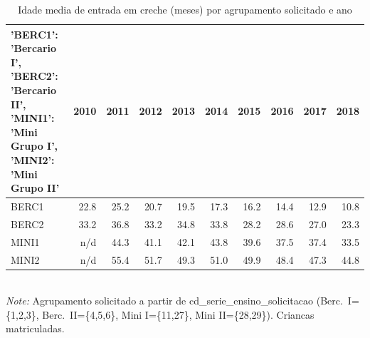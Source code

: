 \begin{table}[htbp]\centering
\caption{Idade media de entrada em creche (meses) por agrupamento solicitado e ano}
\label{tab:T3d_agrup}
\small
\setlength{\tabcolsep}{4pt}
\begin{tabular}{lrrrrrrrrr}
\toprule
{'BERC1': 'Bercario I', 'BERC2': 'Bercario II', 'MINI1': 'Mini Grupo I', 'MINI2': 'Mini Grupo II'} & 2010 & 2011 & 2012 & 2013 & 2014 & 2015 & 2016 & 2017 & 2018 \\
\midrule
BERC1 & 22.8 & 25.2 & 20.7 & 19.5 & 17.3 & 16.2 & 14.4 & 12.9 & 10.8 \\
BERC2 & 33.2 & 36.8 & 33.2 & 34.8 & 33.8 & 28.2 & 28.6 & 27.0 & 23.3 \\
MINI1 & n/d & 44.3 & 41.1 & 42.1 & 43.8 & 39.6 & 37.5 & 37.4 & 33.5 \\
MINI2 & n/d & 55.4 & 51.7 & 49.3 & 51.0 & 49.9 & 48.4 & 47.3 & 44.8 \\
\bottomrule
\end{tabular}
\\[3pt]{\footnotesize \textit{Note:} Agrupamento solicitado a partir de cd\_serie\_ensino\_solicitacao (Berc.\ I=\{1,2,3\}, Berc.\ II=\{4,5,6\}, Mini I=\{11,27\}, Mini II=\{28,29\}). Criancas matriculadas.}
\end{table}
